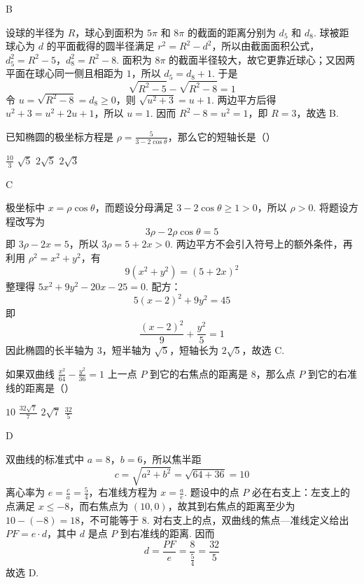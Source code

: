 \begin{answer}
B
\end{answer}

\begin{solution}
设球的半径为 \(R\)，球心到面积为 \(5\pi\) 和 \(8\pi\) 的截面的距离分别为 \(d_5\) 和 \(d_8\). 球被距球心为 \(d\) 的平面截得的圆半径满足 \(r^2=R^2-d^2\)，所以由截面面积公式，
\(d_5^2=R^2-5\)，\(d_8^2=R^2-8\).
面积为 \(8\pi\) 的截面半径较大，故它更靠近球心；又因两平面在球心同一侧且相距为 \(1\)，所以 \(d_5=d_8+1\). 于是
\[
\sqrt{R^2-5}-\sqrt{R^2-8}=1
\]
令 \(u=\sqrt{R^2-8}=d_8\geqslant0\)，则 \(\sqrt{u^2+3}=u+1\). 两边平方后得 \(u^2+3=u^2+2u+1\)，所以 \(u=1\). 因而 \(R^2-8=u^2=1\)，即 \(R=3\)，故选 B.
\end{solution}

\begin{problem}
已知椭圆的极坐标方程是 \(\rho = \frac{5}{3 - 2\cos \theta}\)，那么它的短轴长是（\quad）

\choices
    {\(\frac{10}{3}\)}
    {\(\sqrt{5}\)}
    {\(2\sqrt{5}\)}
    {\(2\sqrt{3}\)}
\end{problem}

\begin{answer}
C
\end{answer}

\begin{solution}
极坐标中 \(x=\rho\cos\theta\)，而题设分母满足 \(3-2\cos\theta\geqslant1>0\)，所以 \(\rho>0\). 将题设方程改写为
\[
3\rho-2\rho\cos\theta=5
\]
即 \(3\rho-2x=5\)，所以 \(3\rho=5+2x>0\). 两边平方不会引入符号上的额外条件，再利用 \(\rho^2=x^2+y^2\)，有
\[
9(x^2+y^2)=(5+2x)^2
\]
整理得 \(5x^2+9y^2-20x-25=0\). 配方：
\[
5(x-2)^2+9y^2=45
\]
即
\[
\frac{(x-2)^2}{9}+\frac{y^2}{5}=1
\]
因此椭圆的长半轴为 \(3\)，短半轴为 \(\sqrt5\)，短轴长为 \(2\sqrt5\)，故选 C.
\end{solution}

\begin{problem}
如果双曲线 \(\frac{x^2}{64} - \frac{y^2}{36} = 1\) 上一点 \(P\) 到它的右焦点的距离是 \(8\)，那么点 \(P\) 到它的右准线的距离是（\quad）

\choices
    {\(10\)}
    {\(\frac{32\sqrt{7}}{7}\)}
    {\(2\sqrt{7}\)}
    {\(\frac{32}{5}\)}
\end{problem}

\begin{answer}
D
\end{answer}

\begin{solution}
双曲线的标准式中 \(a=8\)，\(b=6\)，所以焦半距
\[
c=\sqrt{a^2+b^2}=\sqrt{64+36}=10
\]
离心率为 \(e=\frac{c}{a}=\frac54\)，右准线方程为 \(x=\frac{a}{e}\). 题设中的点 \(P\) 必在右支上：左支上的点满足 \(x\leqslant-8\)，而右焦点为 \((10,0)\)，故其到右焦点的距离至少为 \(10-(-8)=18\)，不可能等于 \(8\). 对右支上的点，双曲线的焦点—准线定义给出 \(PF=e\cdot d\)，其中 \(d\) 是点 \(P\) 到右准线的距离. 因而
\[
d=\frac{PF}{e}=\frac{8}{\frac54}=\frac{32}{5}
\]
故选 D.
\end{solution}

